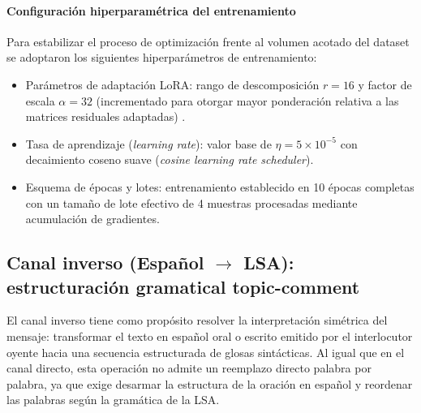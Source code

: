 \paragraph{Configuración hiperparamétrica del entrenamiento}
Para estabilizar el proceso de optimización frente al volumen acotado del dataset se adoptaron los siguientes hiperparámetros de entrenamiento:
\begin{itemize}
    \item Parámetros de adaptación LoRA: rango de descomposición $r = 16$ y factor de escala $\alpha = 32$ (incrementado para otorgar mayor ponderación relativa a las matrices residuales adaptadas) \parencite{hu2022lora}.
    \item Tasa de aprendizaje (\textit{learning rate}): valor base de $\eta = 5 \times 10^{-5}$ con decaimiento coseno suave (\textit{cosine learning rate scheduler}).
    \item Esquema de épocas y lotes: entrenamiento establecido en 10 épocas completas con un tamaño de lote efectivo de 4 muestras procesadas mediante acumulación de gradientes.
\end{itemize}

\subsection{Canal inverso (\texorpdfstring{Español $\rightarrow$ LSA}{Español -> LSA}): estructuración gramatical topic-comment}

El canal inverso tiene como propósito resolver la interpretación simétrica del mensaje: transformar el texto en español oral o escrito emitido por el interlocutor oyente hacia una secuencia estructurada de glosas sintácticas. Al igual que en el canal directo, esta operación no admite un reemplazo directo palabra por palabra, ya que exige desarmar la estructura de la oración en español y reordenar las palabras según la gramática de la LSA.

